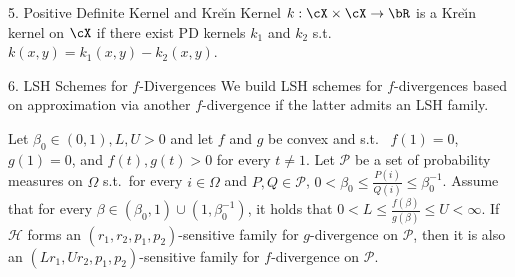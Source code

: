\documentclass[final]{beamer}
\newcommand{\kr}{Kre\u{\i}n\xspace}
\newlength{\onecolwid}
\begin{document}
\begin{frame}[t]
\begin{columns}[t]
\begin{column}{\onecolwid}
\begin{block}{5. Positive Definite Kernel and \kr Kernel}
	\structure{\textbf{\kr kernel.
	}}
		 $ 
		k:\cX\times\cX\to \bR $ is a \kr kernel on $ \cX $ if there exist 
		PD kernels $ k_1 $ and $ k_2 $ s.t.\ $ 
		k(x,y)=k_1(x,y)-k_2(x,y) $.

\end{block}

\begin{block}{6. LSH Schemes for $ f $-Divergences}
	We build LSH schemes for $ f $-divergences based on approximation via 
	another $ 
	f $-divergence if the latter admits an LSH family. 
	
	
	
	
	
	Let $ \beta_0\in (0,1),L,U>0 $ and let $ f $ and $ g $ be convex and s.t.\
	 $ f(1)=0 $, $ g(1)=0 $, and $f(t), g(t)>0 $ for every $ 
	t\ne 1 
	$. 
	Let $ \mathcal{P} $ be a set of probability measures
	on 
	 $ \Omega $ s.t.\ for every $ i\in 
	\Omega $ and $ 
	P, Q\in \mathcal{P} $, $
	0< \beta_0\le \frac{P(i)}{Q(i)} \le \beta_0^{-1}
	$.
	Assume that for every $ \beta\in 
	(\beta_0, 1)\cup (1,\beta_0^{-1}) $, it holds that
	$
	0<L\le \frac{f(\beta)}{g(\beta)} \le U < \infty$.
	If $ \mathcal{H} $ forms 
	an $ (r_1, r_2, p_1,p_2) $-sensitive family for $ 
	g 
	$-divergence on $ \mathcal{P} $, then it is also an  
	$ (Lr_1, 
	Ur_2, p_1,p_2)  
	$-sensitive family for $ f $-divergence on $ \mathcal{P} $.
	

\end{block}
\end{column}
\end{columns}
\end{frame}
\end{document}
